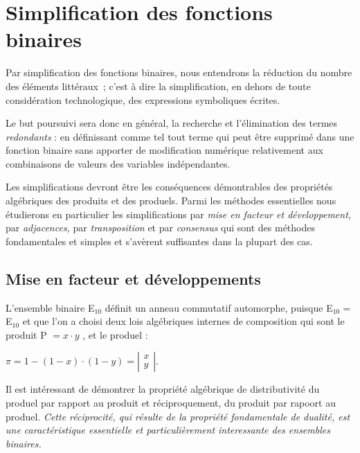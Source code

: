 \ifdefined\COMPLETE
\else
    
    
\fi


\chapter{Simplification des fonctions binaires}

Par simplification des fonctions binaires, nous entendrons la réduction
du nombre des éléments littéraux~; c'est à dire la simplification,
en dehors de toute considération technologique, des expressions symboliques
écrites.

Le but poursuivi sera donc en général, la recherche et l'élimination
des termes \emph{redondants} : en définissant comme tel tout terme
qui peut être supprimé dans une fonction binaire sans apporter de
modification numérique relativement aux combinaisons de valeurs des
variables indépendantes.

Les simplifications devront être les conséquences démontrables des
propriétés algébriques des produits et des produels. Parmi les méthodes
essentielles nous étudierons en particulier les simplifications par
\emph{mise en facteur et développement, }par\emph{ adjacences, }par\emph{
transposition }et par\emph{ consensus} qui sont des méthodes fondamentales
et simples et s'avèrent suffisantes dans la plupart des cas.

\section{Mise en facteur et développements}

L'ensemble binaire \og E$_{10}$ \fg{} définit un anneau commutatif
automorphe, puisque \og E$_{10}=$ E$_{10}$ \fg{} et que l'on a
choisi deux lois algébriques internes de composition qui sont le produit
\og P $=x\cdot y$  \fg{}, et le produel : 

\medskip

$\pi=1-\left(1-x\right)\cdot\left(1-y\right)=\left|\begin{array}{c}
x\\
y
\end{array}\right|$.

\medskip

Il est intéressant de démontrer la propriété algébrique de distributivité
du produel par rapport au produit et réciproquement, du produit par
rapoort au produel. \textit{Cette réciprocité, qui résulte de la propriété
fondamentale de dualité, est une caractéristique essentielle et particulièrement
interessante des ensembles binaires.}

